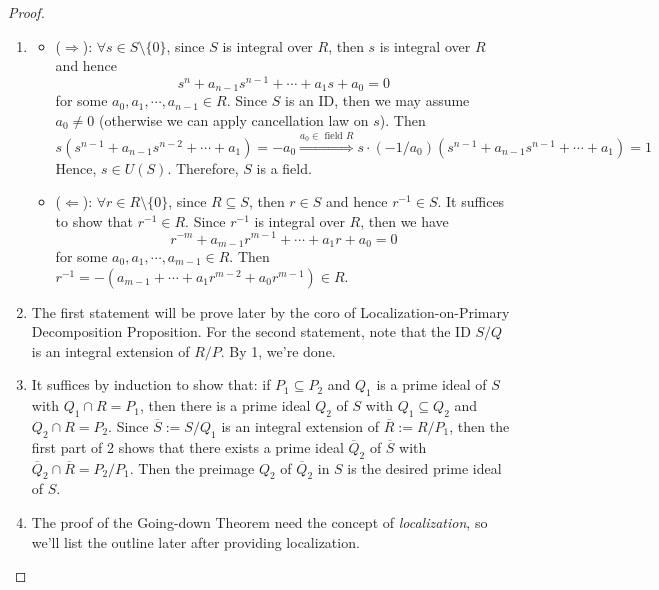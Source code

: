 \begin{proof}
    \begin{enumerate}
        \item \begin{itemize}
            \item ($\Rightarrow$): $\forall s\in S\setminus \{0\}$, since $S$ is integral over $R$, then $s$ is integral over $R$ and hence
            $$s^n+ a_{n-1}s^{n-1} +\cdots+ a_1s +a_0=0$$
            for some $a_0,a_1 ,\cdots, a_{n-1}\in R$. Since $S$ is an ID, then we may assume $a_0\neq 0$ (otherwise we can apply cancellation law on $s$). Then
            $$s(s^{n-1}+ a_{n-1}s^{n-2} +\cdots+ a_1)=- a_0 \overset{a_0 \in \text{ field } R}{\Longrightarrow} s\cdot (-1/a_0) (s^{n-1} +a_{n-1}s^{n-1} +\cdots+ a_1)=1$$
            Hence, $s\in U(S)$. Therefore, $S$ is a field.

            \item ($\Leftarrow$): $\forall r\in R\setminus \{0\}$, since $R\subseteq S$, then $r\in S$ and hence $r^{-1}\in S$. It suffices to show that $r^{-1}\in R$. Since $r^{-1}$ is integral over $R$, then we have
            $$r^{-m}+ a_{m-1}r^{m-1}+ \cdots+ a_1r+a_0=0$$
            for some $a_0,a_1 ,\cdots, a_{m-1}\in R$. Then $r^{-1}= -(a_{m-1} +\cdots+ a_1r^{m-2}+ a_0r^{m-1}) \in R$.
        \end{itemize}

        \item The first statement will be prove later by the coro of Localization-on-Primary Decomposition Proposition. For the second statement, note that the ID $S/Q$ is an integral extension of $R/P$. By 1, we're done.

        \item It suffices by induction to show that: if $P_1\subseteq P_2$ and $Q_1$ is a prime ideal of $S$ with $Q_1 \cap R=P_1$, then there is a prime ideal $Q_2$ of $S$ with $Q_1 \subseteq Q_2$ and $Q_2 \cap R=P_2$. Since $\overline{S}:= S/Q_1$ is an integral extension of $\overline{R}:= R/P_1$, then the first part of 2 shows that there exists a prime ideal $\overline{Q}_2$ of $\overline{S}$ with $\overline{Q}_2 \cap \overline{R}=P_2/P_1$. Then the preimage $Q_2$ of $\overline{Q}_2$ in $S$ is the desired prime ideal of $S$.

        \item The proof of the Going-down Theorem need the concept of \textit{localization}, so we'll list the outline later after providing localization.
    \end{enumerate}
\end{proof}

